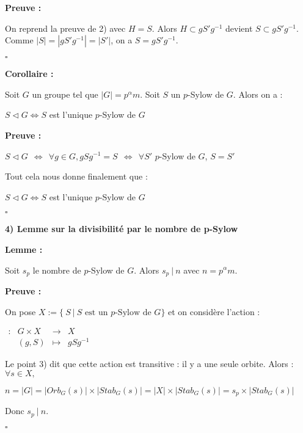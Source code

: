 \documentclass{report}
\renewenvironment{leftbar}{%
  \def\FrameCommand{\vrule width 0.4pt \hspace{10pt}}%
  \MakeFramed {\advance\hsize-\width \FrameRestore}}%
 {\endMakeFramed}%
\newenvironment{preuve}{\vspace*{0.5cm}
    \begin{leftbar}
    \noindent\textbf{Preuve :}\par}{
    \begin{flushright}
    $\square$
    \end{flushright}
    \end{leftbar}
}
\newenvironment{corollaire}{\begin{tcolorbox}[colframe= white]
    \textbf{Corollaire :} \par}
    {\end{tcolorbox}}
\newenvironment{lemme}[2][white]{\begin{tcolorbox}[colframe= #1]
    \textbf{Lemme :} #2  \par}
    {\end{tcolorbox}}
\newcommand{\fonction}[5]{
    \begin{array}{l|rcl}
    #1: & #2 & \longrightarrow & #3 \\
        & #4 & \longmapsto & #5 
    \end{array}
}
\begin{document}
        \begin{preuve}
            On reprend la preuve de 2) avec $H=S$. Alors $H\subset gS'g^{-1}$ devient $S \subset gS'g^{-1}$. Comme $|S| = |gS'g^{-1}|=|S'|$, on a $S=gS'g^{-1}$.
        \end{preuve}
    
        \begin{corollaire}
            Soit $G$ un groupe tel que $|G| = p^\alpha m$. Soit $S$ un $p$-Sylow de $G$. Alors on a : \vspace{2mm}
            \begin{center}
                $S\triangleleft G \Longleftrightarrow S $ est l'unique $p$-Sylow de $G$
            \end{center}
        \end{corollaire}
        
        
        \begin{preuve}
            \begin{center}
                $S \triangleleft G ~~ \Longleftrightarrow ~~ \forall g\in G , gSg^{-1}=S ~~ \Longleftrightarrow ~~ \forall S' $ $p$-Sylow de $G$, $S = S'$
            \end{center}
        
            Tout cela nous  donne finalement que : 
        
            \begin{center}
                $S \triangleleft G \Longleftrightarrow S $ est l'unique $p$-Sylow de $G$
            \end{center}
        \end{preuve}


\textbf{4) Lemme sur la divisibilité par le nombre de p-Sylow}
        
        \begin{lemme}{}
            Soit $s_p$ le nombre de $p$-Sylow de $G$. Alors $s_p ~|~n$ avec $n=p^\alpha m$.
        \end{lemme}
        \begin{preuve}
        	On pose $X:=\{~S~|~S \text{ est un }p\text{-Sylow de } G\}$ et on considère l'action : 
        	
        	\begin{center}
        		$\fonction{}{G \times X}{X}{(g,S)}{gSg^{-1}}$
        	\end{center}
        	
        	Le point 3) dit que cette action est transitive : il y a une seule orbite. Alors : $\forall s \in X, $
        	\begin{center}
        		$ n=|G|=|Orb_G(s)|\times |Stab_G(s)| = |X|\times |Stab_G(s)|=s_p\times|Stab_G(s)|$
        	\end{center}
        	
        	
        	
        	Donc $s_p ~|~n$.
        \end{preuve}
               
\end{document}
